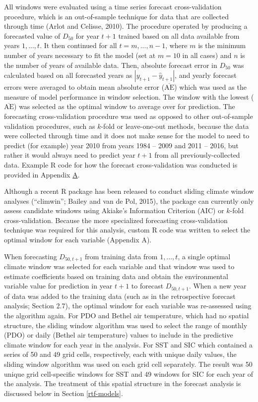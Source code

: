 \documentclass[12pt,]{book}
\theoremstyle{definition}
\theoremstyle{definition}
\theoremstyle{definition}
\theoremstyle{remark}
\begin{document}
All windows were evaluated using a time series forecast cross-validation
procedure, which is an out-of-sample technique for data that are
collected through time (Arlot and Celisse, 2010). The procedure operated
by producing a forecasted value of \(D_{50}\) for year \(t+1\) trained
based on all data available from years \(1,..., t\). It then continued
for all \(t = m, ..., n-1\), where \(m\) is the minimum number of years
necessary to fit the model (set at \(m = 10\) in all cases) and \(n\) is
the number of years of available data. Then, absolute forecast error in
\(D_{50}\) was calculated based on all forecasted years as
\(|y_{t+1} - \hat{y}_{t+1}|\), and yearly forecast errors were averaged
to obtain mean absolute error (\(\overline{\text{AE}}\)) which was used
as the measure of model performance in window selection. The window with
the lowest (\(\overline{\text{AE}}\)) was selected as the optimal window
to average over for prediction. The forecasting cross-validation
procedure was used as opposed to other out-of-sample validation
procedures, such as \(k\)-fold or leave-one-out methods, because the
data were collected through time and it does not make sense for the
model to need to predict (for example) year 2010 from years 1984 -- 2009
and 2011 -- 2016, but rather it would always need to predict year
\(t+1\) from all previously-collected data. Example R code for how the
forecast cross-validation was conducted is provided in Appendix
\protect\hyperlink{appendix-a}{A}.

Although a recent R package has been released to conduct sliding climate
window analyses (``climwin''; Bailey and van de Pol, 2015), the package
can currently only assess candidate windows using Akiake's Information
Criterion (AIC) or \(k\)-fold cross-validation. Because the more
specialized forecasting cross-validation technique was required for this
analysis, custom R code was written to select the optimal window for
each variable (Appendix A).

When forecasting \(D_{50,t+1}\) from training data from \(1,..., t\), a
single optimal climate window was selected for each variable and that
window was used to estimate coefficients based on training data and
obtain the environmental variable value for prediction in year \(t+1\)
to forecast \(D_{50,t+1}\). When a new year of data was added to the
training data (such as in the retrospective forecast analysis; Section
2.7), the optimal window for each variable was re-assessed using the
algorithm again. For PDO and Bethel air temperature, which had no
spatial structure, the sliding window algorithm was used to select the
range of monthly (PDO) or daily (Bethel air temperature) values to
include in the predictive climate window for each year in the analysis.
For SST and SIC which contained a series of 50 and 49 grid cells,
respectively, each with unique daily values, the sliding window
algorithm was used on each grid cell separately. The result was 50
unique grid cell-specific windows for SST and 49 windows for SIC for
each year of the analysis. The treatment of this spatial structure in
the forecast analysis is discussed below in Section \ref{rtf-models}.
\end{document}
